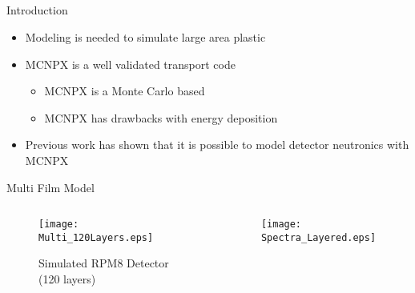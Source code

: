 \subsection*{}
\begin{frame}{Introduction}
  \large
  \vspace{1cm}
  \normalsize
  \begin{itemize}
    \item Modeling is needed to simulate large area plastic
    \item MCNPX is a well validated transport code
    \begin{itemize}
        \item MCNPX is a Monte Carlo based
        \item MCNPX has drawbacks with energy deposition
    \end{itemize}
    \item Previous work has shown that it is possible to model detector neutronics with MCNPX
  \end{itemize}
\end{frame}
\begin{frame}{Multi Film Model}
  \begin{columns}[onlytextwidth]
    \begin{column}{0.49\textwidth}
	    \begin{figure}
        \centering
        \texttt{[image: Multi\_120Layers.eps]}
        \caption{Simulated RPM8 Detector (120 layers)}
      \end{figure}
    \end{column}
    \begin{column}{0.49\textwidth}
      \begin{figure}
        \centering
        \texttt{[image: Spectra\_Layered.eps]}
      \end{figure}
    \end{column}
  \end{columns}
\end{frame}

